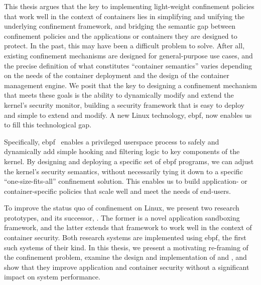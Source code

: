 This thesis argues that the key to implementing light-weight confinement policies that
work well in the context of containers lies in simplifying and unifying the underlying
confinement framework, and bridging the semantic gap between confinement policies and the
applications or containers they are designed to protect. In the past, this may have been
a difficult problem to solve. After all, existing confinement mechanisms are designed for
general-purpose use cases, and the precise definition of what constitutes
\enquote{container semantics} varies depending on the needs of the container deployment
and the design of the container management engine. We posit that the key to designing
a confinement mechanism that meets these goals is the ability to dynamically modify and
extend the kernel's security monitor, building a security framework that is easy to deploy
and simple to extend and modify. A new Linux technology, \gls{ebpf}, now enables us to
fill this technological gap.

Specifically, \gls{ebpf}~\cite{gregg2019_bpf, starovoitov2014_ebpf} enables a privileged
userspace process to safely and dynamically add simple hooking and filtering logic to key
components of the kernel. By designing and deploying a specific set of \gls{ebpf}
programs, we can adjust the kernel's security semantics, without necessarily tying it down
to a specific \enquote{one-size-fits-all} confinement solution. This enables us to build
application- or container-specific policies that scale well and meet the needs of
end-users.

To improve the status quo of confinement on Linux, we present two research prototypes,
\bpfbox{} and its successor, \bpfcontain{}. The former is a novel application sandboxing
framework, and the latter extends that framework to work well in the context of container
security. Both research systems are implemented using \gls{ebpf}, the first such systems
of their kind. In this thesis, we present a motivating re-framing of the confinement
problem, examine the design and implementation of \bpfbox{} and \bpfcontain{}, and show
that they improve application and container security without a significant impact on
system performance.


